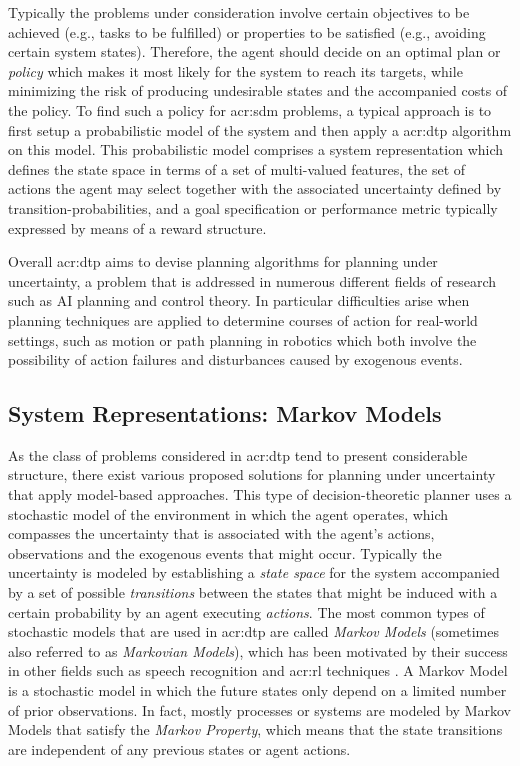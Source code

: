 Typically the problems under consideration involve certain objectives to be achieved (e.g., tasks to be fulfilled) or properties to be satisfied (e.g., avoiding certain system states). 
Therefore, the agent should decide on an optimal plan or \textit{policy} which makes it most likely for the system to reach its targets, while minimizing the risk of producing undesirable states and the accompanied costs of the policy.
To find such a policy for \acrlong{acr:sdm} problems, a typical approach is to first setup a probabilistic model of the system and then apply a \acrshort{acr:dtp} algorithm on this model.
This probabilistic model comprises a system representation which defines the state space in terms of a set of multi-valued features, the set of actions the agent may select together with the associated uncertainty defined by transition-probabilities, and a goal specification or performance metric typically expressed by means of a reward structure.

Overall \acrshort{acr:dtp} aims to devise planning algorithms for planning under uncertainty, a problem that is addressed in numerous different fields of research such as AI planning and control theory.
In particular difficulties arise when planning techniques are applied to determine courses of action for real-world settings, such as motion or path planning in robotics which both involve the possibility of action failures and disturbances caused by exogenous events.

\subsection{System Representations: Markov Models}
\label{sec:system-representation}

As the class of problems considered in \acrshort{acr:dtp} tend to present considerable structure, there exist various proposed solutions for planning under uncertainty that apply model-based approaches.
This type of decision-theoretic planner uses a stochastic model of the environment in which the agent operates, which compasses the uncertainty that is associated with the agent's actions, observations and the exogenous events that might occur.
Typically the uncertainty is modeled by establishing a \textit{state space} for the system accompanied by a set of possible \textit{transitions} between the states that might be induced with a certain probability by an agent executing \textit{actions}.
The most common types of stochastic models that are used in \acrshort{acr:dtp} are called \textit{Markov Models} (sometimes also referred to as \textit{Markovian Models}), which has been motivated by their success in other fields such as speech recognition \cite{baker1992large, gales2008application, rabiner1989tutorial} and \acrfull{acr:rl} techniques \cite{kaelbling1996reinforcement, Brafman2002}.
A Markov Model is a stochastic model in which the future states only depend on a limited number of prior observations. In fact, mostly processes or systems are modeled by Markov Models that satisfy the \textit{Markov Property}, which means that the state transitions are independent of any previous states or agent actions.

